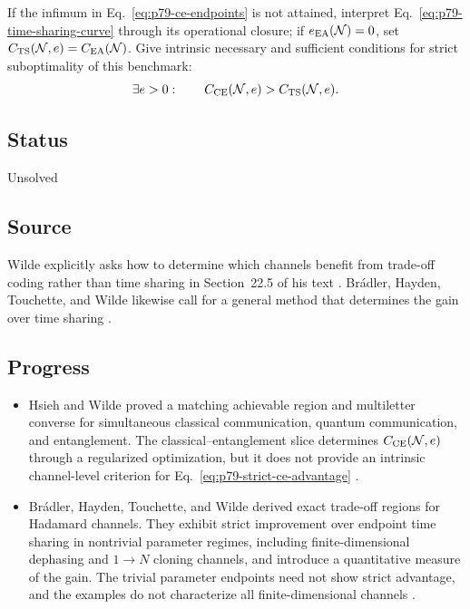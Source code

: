If the infimum in Eq.~\eqref{eq:p79-ce-endpoints} is not attained, interpret
Eq.~\eqref{eq:p79-time-sharing-curve} through its operational closure; if
$e_{\rm EA}(\mathcal N)=0$, set
$C_{\rm TS}(\mathcal N,e)=C_{\rm EA}(\mathcal N)$.  Give intrinsic
necessary and sufficient conditions for strict suboptimality of this
benchmark:
\begin{equation}
  \exists e>0:\qquad
  C_{\rm CE}(\mathcal N,e)>C_{\rm TS}(\mathcal N,e).
  \label{eq:p79-strict-ce-advantage}
\end{equation}

\subsection*{Status}

Unsolved

\subsection*{Source}

Wilde explicitly asks how to determine which channels benefit from trade-off
coding rather than time sharing in Section~22.5 of his text
.  Br\'adler, Hayden, Touchette, and Wilde
likewise call for a general method that determines the gain over time sharing
.

\subsection*{Progress}

\begin{itemize}
  \item Hsieh and Wilde proved a matching achievable region and multiletter
  converse for simultaneous classical communication, quantum communication,
  and entanglement.  The classical--entanglement slice determines
  $C_{\rm CE}(\mathcal N,e)$ through a regularized optimization, but it does
  not provide an intrinsic channel-level criterion for
  Eq.~\eqref{eq:p79-strict-ce-advantage}
  .

  \item Br\'adler, Hayden, Touchette, and Wilde derived exact trade-off
  regions for Hadamard channels.  They exhibit strict improvement over
  endpoint time sharing in nontrivial parameter regimes, including
  finite-dimensional dephasing and $1\to N$ cloning channels, and introduce
  a quantitative measure of the gain.  The trivial parameter endpoints need
  not show strict advantage, and the examples do not characterize all
  finite-dimensional channels
  .
\end{itemize}

